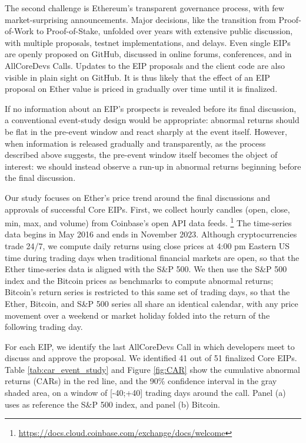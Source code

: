 \documentclass[No]{AEA}
\begin{document}
The second challenge is Ethereum's transparent governance process, with few market-surprising announcements. Major decisions, like the transition from Proof-of-Work to Proof-of-Stake, unfolded over years with extensive public discussion, with multiple proposals, testnet implementations, and delays. Even single EIPs are openly proposed on GitHub, discussed in online forums, conferences, and in AllCoreDevs Calls. Updates to the EIP proposals and the client code are also visible in plain sight on GitHub. It is thus likely that the effect of an EIP proposal on Ether value is priced in gradually over time until it is finalized. 

If no information about an EIP's prospects is revealed before its final discussion, a conventional event-study design would be appropriate: abnormal returns should be flat in the pre-event window and react sharply at the event itself. However, when information is released gradually and transparently, as the process described above suggests, the pre-event window itself becomes the object of interest: we should instead observe a run-up in abnormal returns beginning before the final discussion.
 
Our study focuses on Ether's price trend around the final discussions and approvals of successful Core EIPs. First, we collect hourly candles (open, close, min, max, and volume) from Coinbase's open API data feeds. \footnote{\url{https://docs.cloud.coinbase.com/exchange/docs/welcome}} The time-series data begins in May 2016 and ends in November 2023. Although cryptocurrencies trade 24/7, we compute daily returns using close prices at 4:00 pm Eastern US time during trading days when traditional financial markets are open, so that the Ether time-series data is aligned with the S\&P 500. We then use the S\&P 500 index and the Bitcoin prices as benchmarks to compute abnormal returns; Bitcoin's return series is restricted to this same set of trading days, so that the Ether, Bitcoin, and S\&P 500 series all share an identical calendar, with any price movement over a weekend or market holiday folded into the return of the following trading day. 

For each EIP, we identify the last AllCoreDevs Call in which developers meet to discuss and approve the proposal. We identified 41 out of 51 finalized Core EIPs. Table \ref{tab:car_event_study} and Figure \ref{fig:CAR} show the cumulative abnormal returns (CARs) in the red line, and the 90\% confidence interval in the gray shaded area, on a window of [-40;+40] trading days around the call. Panel (a) uses as reference the S\&P 500 index, and panel (b) Bitcoin. 
 
\end{document}
